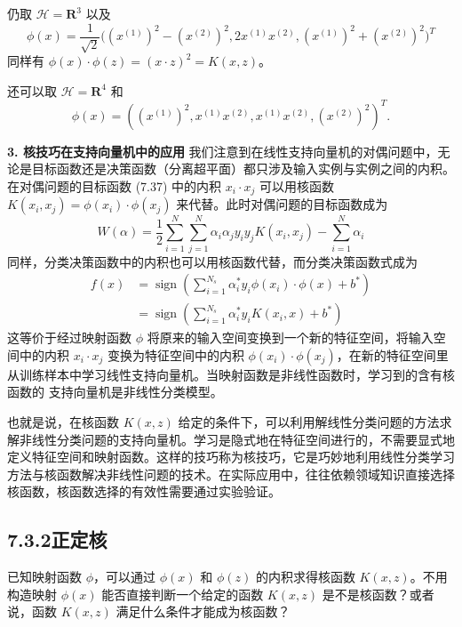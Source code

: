 \documentclass[UTF8, 12pt, fontset=fandol, oneside]{ctexart}
\begin{document}
仍取 $\mathcal{H}=\mathbf{R}^3$ 以及
\[
\phi(x)=\frac{1}{\sqrt{2}}\bigl((x^{(1)})^2-(x^{(2)})^2,2x^{(1)}x^{(2)},(x^{(1)})^2+(x^{(2)})^2\bigr)^T
\]
同样有 $\phi(x)\cdot\phi(z)=(x\cdot z)^2=K(x,z)$。

还可以取 $\mathcal{H}=\mathbf{R}^4$ 和
\[
\phi(x)=((x^{(1)})^2,x^{(1)}x^{(2)},x^{(1)}x^{(2)},(x^{(2)})^2)^T.
\]

\noindent\textbf{3. 核技巧在支持向量机中的应用}\quad
我们注意到在线性支持向量机的对偶问题中，无论是目标函数还是决策函数（分离超平面）都只涉及输入实例与实例之间的内积。在对偶问题的目标函数 (7.37) 中的内积 $x_i\cdot x_j$ 可以用核函数 $K(x_i,x_j)=\phi(x_i)\cdot\phi(x_j)$ 来代替。此时对偶问题的目标函数成为
\begin{equation}
W(\alpha)=\frac{1}{2}\sum_{i=1}^N\sum_{j=1}^N\alpha_i\alpha_j y_i y_j K(x_i,x_j)-\sum_{i=1}^N\alpha_i
\tag{7.67}
\end{equation}
同样，分类决策函数中的内积也可以用核函数代替，而分类决策函数式成为
\begin{equation}
\begin{aligned}
f(x)&=\operatorname{sign}\left(\sum_{i=1}^{N_s}\alpha_i^*y_i\phi(x_i)\cdot\phi(x)+b^*\right)\\
&=\operatorname{sign}\left(\sum_{i=1}^{N_s}\alpha_i^*y_i K(x_i,x)+b^*\right)
\end{aligned}
\tag{7.68}
\end{equation}
这等价于经过映射函数 $\phi$ 将原来的输入空间变换到一个新的特征空间，将输入空间中的内积 $x_i\cdot x_j$ 变换为特征空间中的内积 $\phi(x_i)\cdot\phi(x_j)$，在新的特征空间里从训练样本中学习线性支持向量机。当映射函数是非线性函数时，学习到的含有核函数的
支持向量机是非线性分类模型。

也就是说，在核函数 $K(x,z)$ 给定的条件下，可以利用解线性分类问题的方法求解非线性分类问题的支持向量机。学习是隐式地在特征空间进行的，不需要显式地定义特征空间和映射函数。这样的技巧称为核技巧，它是巧妙地利用线性分类学习方法与核函数解决非线性问题的技术。在实际应用中，往往依赖领域知识直接选择核函数，核函数选择的有效性需要通过实验验证。

\subsection*{7.3.2\quad 正定核}

已知映射函数 $\phi$，可以通过 $\phi(x)$ 和 $\phi(z)$ 的内积求得核函数 $K(x,z)$。不用构造映射 $\phi(x)$ 能否直接判断一个给定的函数 $K(x,z)$ 是不是核函数？或者说，函数 $K(x,z)$ 满足什么条件才能成为核函数？
\end{document}
